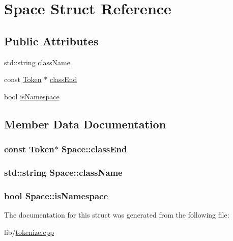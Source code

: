 \hypertarget{struct_space}{\section{Space Struct Reference}
\label{struct_space}
}
\subsection*{Public Attributes}
\begin{DoxyCompactItemize}
\item 
std\-::string \hyperlink{struct_space_a43784bb833ed3aed6291533e1aa62402}{class\-Name}
\item 
const \hyperlink{class_token}{Token} $\ast$ \hyperlink{struct_space_a39eaeb81c552c57f0ece3b69c4500cce}{class\-End}
\item 
bool \hyperlink{struct_space_a351c06e3b69c4f3201d33fb73e7ea36b}{is\-Namespace}
\end{DoxyCompactItemize}


\subsection{Member Data Documentation}
\hypertarget{struct_space_a39eaeb81c552c57f0ece3b69c4500cce}{
\subsubsection[{class\-End}]{\setlength{\rightskip}{0pt plus 5cm}const {\bf Token}$\ast$ Space\-::class\-End}}\label{struct_space_a39eaeb81c552c57f0ece3b69c4500cce}
\hypertarget{struct_space_a43784bb833ed3aed6291533e1aa62402}{
\subsubsection[{class\-Name}]{\setlength{\rightskip}{0pt plus 5cm}std\-::string Space\-::class\-Name}}\label{struct_space_a43784bb833ed3aed6291533e1aa62402}
\hypertarget{struct_space_a351c06e3b69c4f3201d33fb73e7ea36b}{
\subsubsection[{is\-Namespace}]{\setlength{\rightskip}{0pt plus 5cm}bool Space\-::is\-Namespace}}\label{struct_space_a351c06e3b69c4f3201d33fb73e7ea36b}


The documentation for this struct was generated from the following file\-:\begin{DoxyCompactItemize}
\item 
lib/\hyperlink{tokenize_8cpp}{tokenize.\-cpp}\end{DoxyCompactItemize}
